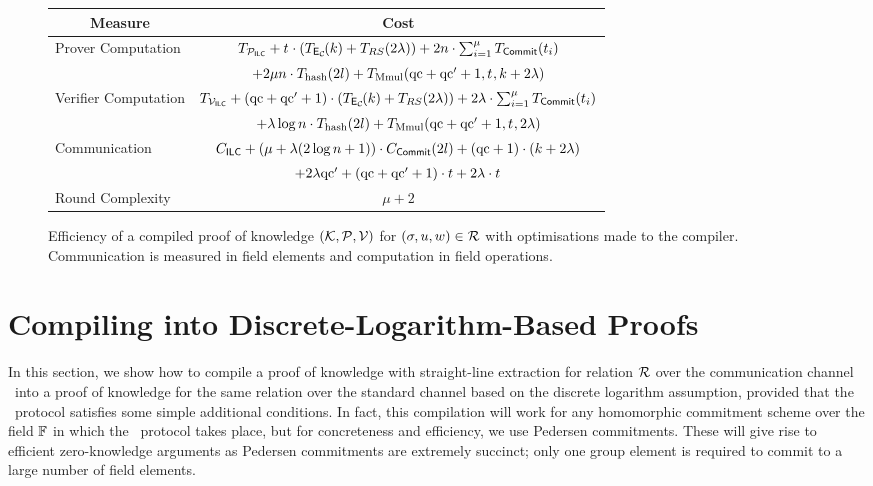 \begin{figure}[!h]
\begin{tabular}{|l|c|}
\hline
\multicolumn{1}{|c|}{\bf Measure} & {\bf Cost} \\
\hline
Prover Computation & $T_{\mathcal{P}_{\mathsf{ILC}}} + {t_{}} \cdot (T_{\mathsf{E}_{\mathcal{C}}\!}(k) + T_{RS}(2\lambda)) + 2n\cdot \sum_{i=1}^{\mu} T_{\mathsf{Commit}}(t_i)$ \\
& $+ 2\mu n \cdot T_{\text{hash}}(2l) + T_{\text{Mmul}}(\mathrm{qc}+\mathrm{qc}'+1,{t_{}},k+2\lambda)$ \\
\hline
Verifier Computation & $T_{\mathcal{V}_{\mathsf{ILC}}} + (\mathrm{qc}+\mathrm{qc}'+1)\cdot (T_{\mathsf{E}_{\mathcal{C}}\!}(k)+ T_{RS}(2\lambda)) + 2\lambda \cdot \sum_{i=1}^{\mu} T_{\mathsf{Commit}}(t_i)$ \\
& $+\lambda \log n \cdot T_{\text{hash}}(2l)+ T_{\text{Mmul}}(\mathrm{qc}+\mathrm{qc}'+1,{t_{}},2\lambda)$\\
\hline
Communication & $C_{\mathsf{ILC}} + (\mu + \lambda(2\log n+1))\cdot C_{\mathsf{Commit}}(2l) + (\mathrm{qc}+1)\cdot(k+2\lambda)$ \\
&$+ 2\lambda\mathrm{qc}'+(\mathrm{qc}+\mathrm{qc}'+1)\cdot t+ 2\lambda\cdot t$ \\
\hline
Round Complexity & $\mu + 2$ \\
\hline
\end{tabular}
\caption{Efficiency of a compiled proof of knowledge $(\mathcal{K},\mathcal{P},\mathcal{V})$ for $(\mathsf{\sigma},u,w)\in \mathcal{R}$ with optimisations made to the compiler. Communication is measured in field elements and computation in field operations.}\label{fig:IOPeff2}
\end{figure}

\section{Compiling into Discrete-Logarithm-Based Proofs}\label{sec:ILCtoDLOG}

In this section, we show how to compile a proof of knowledge with straight-line extraction for relation $\mathcal{R}$ over the communication channel \ILC\ into a proof of knowledge for the same relation over the standard channel based on the discrete logarithm assumption, provided that the \ILC\ protocol satisfies some simple additional conditions. In fact, this compilation will work for any homomorphic commitment scheme over the field $\mathbb{F}$ in which the \ILC\ protocol takes place, but for concreteness and efficiency, we use Pedersen commitments. These will give rise to efficient zero-knowledge arguments as Pedersen commitments are extremely succinct; only one group element is required to commit to a large number of field elements.

